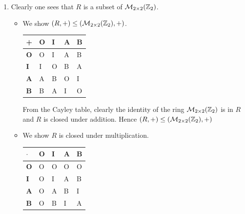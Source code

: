 \begin{enumerate}
    \begin{enumerate}[label=(\roman*)]
        \item Clearly one sees that $R$ is a subset of $\mathcal{M}_{2\times2}(\mathbb{Z}_2)$.
        \begin{itemize}
            \item We show $(R, +)\leq(\mathcal{M}_{2\times2}(\mathbb{Z}_2),+)$.
            \begin{table}[h]
                \centering
                \begin{tabular}{|l|l|l|l|l|}
                    \hline
                    \textbf{+} & \textbf{O} & \textbf{I} & \textbf{A} & \textbf{B} \\ \hline
                    \textbf{O} & O          & I          & A          & B          \\ \hline
                    \textbf{I} & I          & O          & B          & A          \\ \hline
                    \textbf{A} & A          & B          & O          & I          \\ \hline
                    \textbf{B} & B          & A          & I          & O          \\ \hline
                \end{tabular}
            \end{table}
            
            From the Cayley table, clearly the identity of the ring $\mathcal{M}_{2\times2}(\mathbb{Z}_2)$ is in $R$ and $R$ is closed under addition. Hence $(R, +)\leq(\mathcal{M}_{2\times2}(\mathbb{Z}_2),+)$

            \item We show $R$ is closed under multiplication.
            \begin{table}[h]
                \centering
                \begin{tabular}{|l|l|l|l|l|}
                    \hline
                    $\boldsymbol{\cdot}$ & \textbf{O} & \textbf{I} & \textbf{A} & \textbf{B} \\ \hline
                    \textbf{O}           & O          & O          & O          & O          \\ \hline
                    \textbf{I}           & O          & I          & A          & B          \\ \hline
                    \textbf{A}           & O          & A          & B          & I          \\ \hline
                    \textbf{B}           & O          & B          & I          & A          \\ \hline
                \end{tabular}
            \end{table}
            

\end{itemize}
\end{enumerate}
\end{enumerate}
